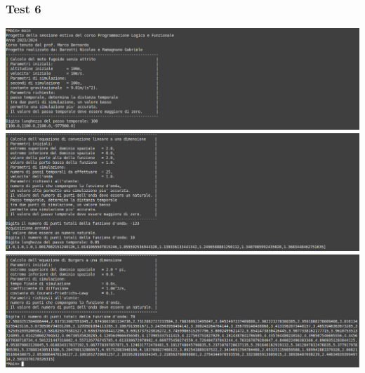 \subsubsection*{Test 6}
\includegraphics[width=\textwidth,height=\textheight,keepaspectratio]{05_testing/image/hs/06_test/01_misto.png}
\\
\includegraphics[width=\textwidth,height=\textheight,keepaspectratio]{05_testing/image/hs/06_test/03_misto.png}
\\
\includegraphics[width=\textwidth,height=\textheight,keepaspectratio]{05_testing/image/hs/06_test/04_misto.png}

